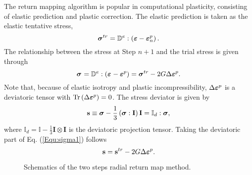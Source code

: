 \documentclass[preprint,5p,twocolumn,11pt,sort&compress]{elsarticle}
\newcommand{\bfsigma}{{\mbox{\boldmath{$\sigma$}}}}
\newcommand{\bfepsilon}{{\mbox{\boldmath{$\varepsilon$}}}}
\newcommand{\bfs}{{\bf s}}
\begin{document}
The return mapping algorithm is popular in computational plasticity, consisting of elastic prediction and plastic correction. The elastic prediction is taken as the elastic tentative stress,
\begin{equation}
{\bfsigma}^{tr} = {\mathbb{D}^e}:\left( {{\bfepsilon} - \bfepsilon_n^p} \right).
\end{equation}
The relationship between the stress at Step $n+1$  and the trial stress is given through
\begin{equation}
\label{Equ:sigma1}
{{\bfsigma}^{} = {\mathbb{D}^e}:\left( {\bfepsilon^{} - \bfepsilon^p} \right)} = {\bfsigma}^{tr} - 2G\Delta \bfepsilon^p.
\end{equation}
Note that, because of elastic isotropy and plastic incompressibility, $\Delta \bfepsilon^p$ is a deviatoric tensor with ${\rm Tr}\left( {\Delta \bfepsilon^p} \right)=0$.
The stress deviator is given by
\begin{equation}
\bfs \equiv {\bfsigma} - \frac{1}{3}\left( {{\bfsigma}:{\mathbf{I}}} \right){\mathbf{I}} = {\mathbb{I}_d}:{\bfsigma},
\end{equation}
where ${\mathbb{I}_d} = \mathbb{I} - \frac{1}{3}{\mathbf{I}} \otimes {\mathbf{I}}$ is the deviatoric projection tensor.
Taking the deviatoric part of Eq. (\ref{Equ:sigma1}) follows
\begin{equation}\label{Equ:sminusa1}
{\bfs} = \bfs^{tr} - 2G\Delta \bfepsilon^p.
\end{equation}

\begin{figure}[!htp]
\caption{Schematics of the two steps radial return map method.}
\label{Fig:radial_return_map}
\end{figure}
\end{document}
